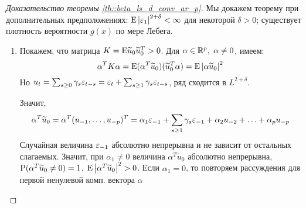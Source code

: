 \begin{proof}[Доказательство теоремы \ref{th::beta_ls_d_conv_ar_p}]
    Мы докажем теорему при дополнительных предположениях: $\E\left\lvert \eps_1\right\rvert ^{2+\delta}<\infty$ для некоторой $\delta>0$;
    существует плотность вероятности $g(x)$ по мере Лебега.
    \begin{enumerate}
        \item Покажем, что матрица $K=\E\widetilde{u}_0\widetilde{u}_0^T>0$. Для $\alpha\in\R^p,\ \alpha\neq0$, имеем:
        \[\alpha^TK\alpha=\E(\alpha^T\widetilde{u}_0)(\widetilde{u}_0^T\alpha)=\E\left\lvert \alpha\widetilde{u}_0\right\rvert ^2\]
        Но $u_t=\sum_{s\geq0}\gamma_s\eps_{t-s}=\eps_t+\sum_{s\geq1}\gamma_s\eps_{t-s}$, ряд сходится в $L^{2+\delta}$.

        Значит, 
        \[\alpha^T\widetilde{u}_0=\alpha^T(u_{-1},\ldots,u_{-p})^T=\alpha_1\eps_{-1}+\sum_{s\geq1}\gamma_s\eps_{-1}+\alpha_2u_{-2}+\ldots+\alpha_pu_{-p}\]
        Случайная величина $\eps_{-1}$ абсолютно непрерывна и не зависит от остальных слагаемых. Значит, при $\alpha_1\neq0$
        величина $\alpha^T\widetilde{u}_0$ абсолютно непрерывна, $\P(\alpha^T\widetilde{u}_0\neq0)=1$, $\E\left\lvert \alpha^T\widetilde{u}_0\right\rvert ^2>0$.
        Если $\alpha_1=0$, то повторяем рассуждения для первой ненулевой комп. вектора $\alpha$


\end{enumerate}
\end{proof}
